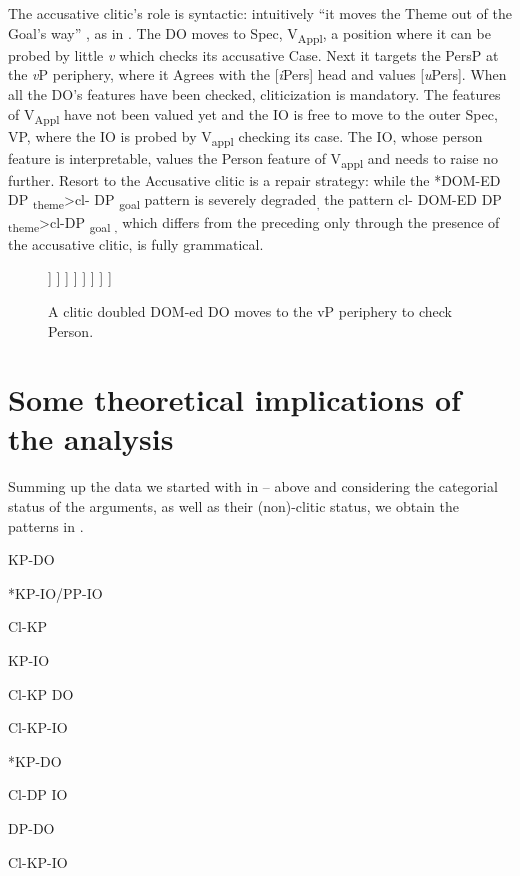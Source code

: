 \documentclass[output=paper,colorlinks,citecolor=brown,nonflat]{langsci/langscibook}
\begin{document}
The accusative clitic’s role is syntactic: intuitively “it moves the Theme out of the Goal’s way” \citep{Anagnostopoulou2006}, as in . The DO moves to Spec, V\textsubscript{Appl}, a position where it can be probed by little \textit{v} which checks its accusative Case. Next it targets the PersP at the \textit{v}P periphery, where it Agrees with the [\textit{i}Pers] head and values [\textit{u}Pers]. When all the DO’s features have been checked, cliticization is mandatory. The features of V\textsubscript{Appl} have not been valued yet and the IO is free to move to the outer Spec, VP, where the IO is probed by V\textsubscript{appl} checking its case. The IO, whose person feature is interpretable, values the Person feature of V\textsubscript{appl} and needs to raise no further. Resort to the Accusative clitic is a repair strategy: while the *DOM-ED DP \textsubscript{theme}>{cl}{}- DP \textsubscript{goal} pattern is severely degraded\textsubscript{,} the pattern {cl}{}- DOM-ED DP \textsubscript{theme}>{cl}{}-DP \textsubscript{goal ,} which differs from the preceding only through the presence of the accusative clitic, is fully grammatical.

\begin{figure}%
	\begin{forest}
		[PersP
			[Pers
			]
			[\textit{v}P
				[KP\textsubscript{Theme}
				]
				[\textit{v}P
					[DP\textsubscript{Agent}
					]
					[\textit{v}'
						[\textit{v}
						]
						[V\textsubscript{Appl}P
								[KP\textsubscript{Theme}
								]
								[V'\textsubscript{Appl}
									[V\textsubscript{Appl}
									]
									[VP
										[KP\textsubscript{Goal}
										]
									]
								]
						]
						]
					]
				]
			]
		]
	\end{forest}
	\caption{\label{fig:cornilescu:13} A clitic doubled DOM-ed DO moves to the vP periphery to check Person.}
\end{figure}


\section{Some theoretical implications of the analysis}\label{sec:cornilescu:6} %

Summing up the data we started with in  –  above and considering the categorial status of the arguments, as well as their (non)-clitic status, we obtain the patterns in .

\ea%
   \label{ex:cornilescu:35}
   \ea\parbox{1.5cm}{KP-DO} *KP-IO/PP-IO \label{ex:cornilescu:35a}
   \ex\parbox{1.5cm}{Cl-KP}     KP-IO \label{ex:cornilescu:35b}
   \ex\parbox{1.5cm}{Cl-KP DO}  Cl-KP-IO \label{ex:cornilescu:35c}
   \ex\parbox{1.5cm}{*KP-DO} Cl-DP IO \label{ex:cornilescu:35d}
   \ex\parbox{1.5cm}{DP-DO} Cl-KP-IO \label{ex:cornilescu:35e}
   \z
   \z
\end{document}
